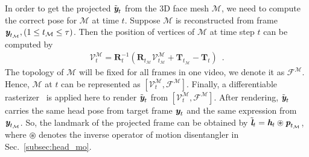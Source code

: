 \documentclass[runningheads]{llncs}
\def\mathbi#1{\textbf{\em #1}}
\begin{document}
\indent  In order to get the projected $\tilde{\mathbi{y}}_t$ from the 3D face mesh $\mathcal{M}$, we need to compute the correct pose for $\mathcal{M}$ at time $t$. Suppose $\mathcal{M}$ is reconstructed from frame $\mathbi{y}_{t_{\mathcal{M}}}, (1\le t_{\mathcal{M}}\le \tau)$. Then the position of vertices of $\mathcal{M}$ at time step $t$ can be computed by
\begin{equation}
\begin{aligned}
\mathcal{V}^{\mathcal{M}}_t = \mathbf{R}_t^{-1}(\mathbf{R}_{t_{\mathcal{M}}}\mathcal{V}^{\mathcal{M}}_{t_{\mathcal{M}}} + \mathbf{T}_{t_{\mathcal{M}}} - \mathbf{T}_t) \enspace.
\end{aligned}
\label{eq:projector}    
\end{equation}
The topology of $\mathcal{M}$ will be fixed for all frames in one video, we denote it as $\mathcal{F}^{\mathcal{M}}$. Hence, $\mathcal{M}$ at $t$ can be represented as $\left[\mathcal{V}^{\mathcal{M}}_t, \mathcal{F}^{\mathcal{M}}\right]$. Finally, a differentiable rasterizer~\cite{liu2019softras} is applied here to render $\tilde{\mathbi{y}}_t$ from $\left[\mathcal{V}^{\mathcal{M}}_t, \mathcal{F}^{\mathcal{M}}\right]$. After rendering, $\tilde{\mathbi{y}}_t$ carries the same head pose from target frame ${\mathbi{y}}_{t}$ and the same expression from  ${\mathbi{y}}_{t_{\mathcal{M}}}$. So, the landmark of the projected frame can be obtained by $\tilde{\mathbi{l}}_t= \mathbi{h}_t \circledast \mathbi{p}_{t_{\mathcal{M}} }$, where $\circledast$ denotes the inverse operator of motion disentangler in Sec.~\ref{subsec:head_mo}.
\end{document}
